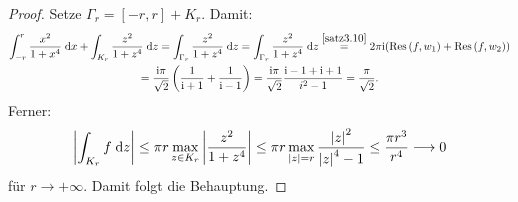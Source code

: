\documentclass[a4paper,twoside,DIV15,BCOR12mm]{scrbook}
\begin{document}
\begin{bsp}
\begin{proof}
Setze $\Gamma_r = [-r,r]+K_r$. Damit:
\begin{gather*}
\int_{-r}^{r}{\frac{x^2}{1+x^4}}\;\mathrm{d} x + \int_{K_r}^{}{\frac{z^2}{1+z^4}}\;\mathrm{d} z = \int_{\Gamma_r}^{}{\frac{z^2}{1+z^4}}\;\mathrm{d} z = \int_{\Gamma_r}^{}{\frac{z^2}{1+z^4}}\;\mathrm{d} z \overset{\ref{satz3.10}}{=}2\pi\mathrm{i}(\mathrm{Res}\left(f,w_1\right)+\mathrm{Res}\left(f,w_2\right))\\
=\frac{\mathrm{i}\pi}{\sqrt{2}}\left(\frac{1}{\mathrm{i}+1}+\frac{1}{\mathrm{i}-1}\right) = \frac{\mathrm{i}\pi}{\sqrt{2}}\frac{\mathrm{i}-1+\mathrm{i}+1}{i^2-1}=\frac{\pi}{\sqrt{2}}.
\end{gather*}
Ferner:
\[\left\lvert\int_{K_r}^{}{f}\;\mathrm{d} z\right\lvert\leq\pi r\max_{z\in K_r}\left\lvert\frac{z^2}{1+z^4}\right\lvert\leq\pi r\max_{\left\lvert z\right\lvert=r}\frac{\left\lvert z\right\lvert^2}{\left\lvert z\right\lvert^4-1}\leq\frac{\pi r^3}{r^4}\longrightarrow 0\]
für $r\to+\infty$. Damit folgt die Behauptung.
\end{proof}
\end{bsp}
\end{document}
